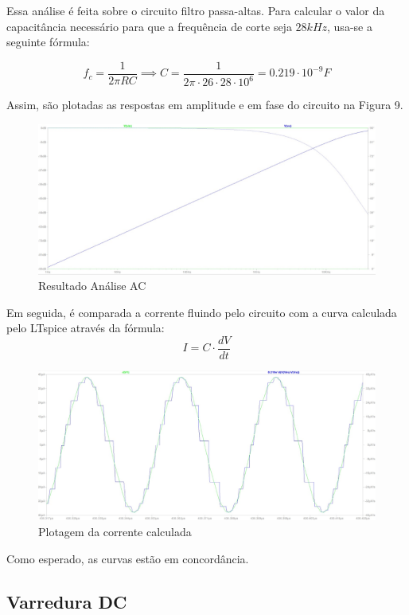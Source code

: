 \documentclass[10pt,twocolumn,letterpaper]{article}
\begin{document}
Essa análise é feita sobre o circuito filtro passa-altas. Para calcular o valor da capacitância necessário para que a frequência de corte seja $28kHz$, usa-se a seguinte fórmula:

\[f_c=\frac{1}{2\pi RC} \implies C = \frac{1}{2\pi\cdot26\cdot28\cdot10^6}=0.219\cdot10^{-9}F\]

Assim, são plotadas as respostas em amplitude e em fase do circuito na Figura 9.

\begin{figure}[h]
\caption{Resultado Análise AC}
\includegraphics[scale=0.15]{figuras/fig9}
\end{figure}\newpage

Em seguida, é comparada a corrente fluindo pelo circuito com a curva calculada pelo LTspice através da fórmula:
\[I = C\cdot\frac{dV}{dt}\]

\begin{figure}[h]
\caption{Plotagem da corrente calculada}
\includegraphics[scale=0.15]{figuras/fig10}
\end{figure}

Como esperado, as curvas estão em concordância.

\subsection{Varredura DC}
\end{document}
